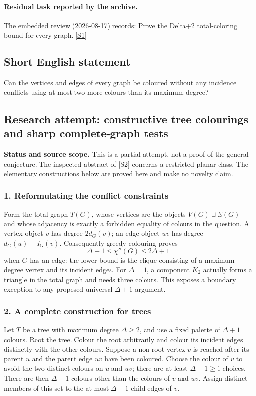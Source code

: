 \documentclass[11pt,a4paper]{article}
\newcommand{\sref}[2]{\hyperlink{source:#1:#2}{[S#2]}}
\begin{document}
\paragraph{Residual task reported by the archive.}

The embedded review (2026-08-17) records: Prove the Delta+2 total-coloring bound for every graph. \sref{1165}{1}

\subsection{Short English statement}

Can the vertices and edges of every graph be coloured without any incidence conflicts using at most two more colours than its maximum degree?

\subsection{Research attempt: constructive tree colourings and sharp complete-graph tests}
\textbf{Status and source scope.} This is a partial attempt, not a proof of the general conjecture. The inspected abstract of [S2] concerns a restricted planar class. The elementary constructions below are proved here and make no novelty claim.

\subsubsection{1. Reformulating the conflict constraints}
Form the total graph $T(G)$, whose vertices are the objects $V(G)\sqcup E(G)$ and whose adjacency is exactly a forbidden equality of colours in the question. A vertex-object $v$ has degree $2d_G(v)$; an edge-object $uv$ has degree $d_G(u)+d_G(v)$. Consequently greedy colouring proves
\[\Delta+1\leq\chi''(G)\leq2\Delta+1\]
when $G$ has an edge: the lower bound is the clique consisting of a maximum-degree vertex and its incident edges. For $\Delta=1$, a component $K_2$ actually forms a triangle in the total graph and needs three colours. This exposes a boundary exception to any proposed universal $\Delta+1$ argument.

\subsubsection{2. A complete construction for trees}
Let $T$ be a tree with maximum degree $\Delta\geq2$, and use a fixed palette of $\Delta+1$ colours. Root the tree. Colour the root arbitrarily and colour its incident edges distinctly with the other colours. Suppose a non-root vertex $v$ is reached after its parent $u$ and the parent edge $uv$ have been coloured. Choose the colour of $v$ to avoid the two distinct colours on $u$ and $uv$; there are at least $\Delta-1\geq1$ choices. There are then $\Delta-1$ colours other than the colours of $v$ and $uv$. Assign distinct members of this set to the at most $\Delta-1$ child edges of $v$.
\end{document}
